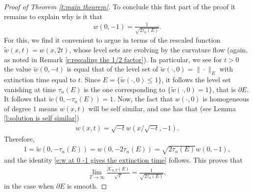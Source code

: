 \documentclass[reqno]{amsart}
\numberwithin{equation}{section}
\begin{document}
\begin{proof}[Proof of Theorem \ref{t:main theorem}]
To conclude this first part of the proof it remains to explain why is it that 
\begin{align}\label{e:w at 0 -1 gives the extinction time}
w(0,-1) = \frac{1}{\sqrt{2\tau_n(E)}}.
\end{align}
For this, we find it convenient to argue in terms of the rescaled function $\tilde w(x,t) = w(x,2t)$, whose level sets are evolving by the curvature flow (again, as noted in Remark \ref{r:rescaling the 1/2 factor}). In particular, we see for $t>0$ the value $\tilde w(0,-t)$ is equal that of the level set of $\tilde w(\cdot,0) = \|\cdot\|_E$ with extinction time equal to $t$. Since $E = \{ \tilde w(\cdot,0) \leq 1\}$, it follows the level set vanishing at time $\tau_n(E)$ is the one corresponding to $\{\tilde w(\cdot,0) = 1\}$, that is $\partial E$. It follows that $\tilde w(0,-\tau_n(E)) = 1$. Now, the fact that $w(\cdot,0)$ is homogeneous of degree $1$ means $w(x,t)$ will be self similar, and one has that (see Lemma \ref{l:solution is self similar})
\begin{align*}
  w(x,t) = \sqrt{-t}w(x/\sqrt{-t},-1).    
\end{align*}
 Therefore, 
\begin{align*}
  1= \tilde w(0,-\tau_n(E)) = w(0,-2\tau_n(E)) = \sqrt{2\tau_n(E)}w(0,-1),
\end{align*}
and the identity \eqref{e:w at 0 -1 gives the extinction time} follows. This proves that
\begin{align*}
  \lim\limits_{T\to \infty}\frac{\mathcal{K}_{n,T}(E)}{\sqrt{T}} = \frac{1}{\sqrt{2\tau_n(E)}},    
\end{align*}
in the case when $\partial E$ is smooth. 


\end{proof}
\end{document}
